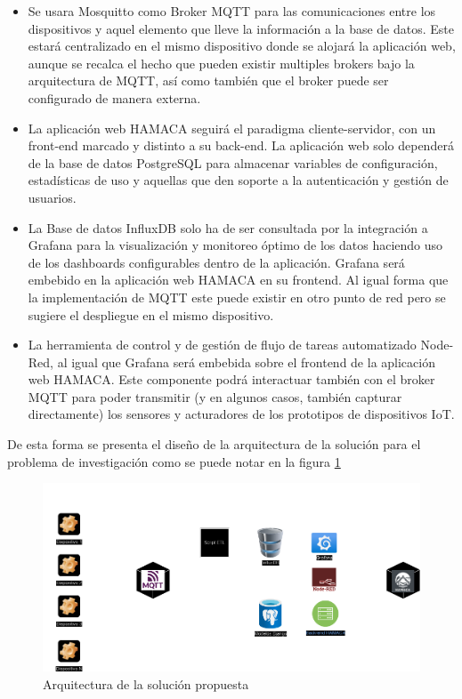 \begin{itemize}

\item Se usara Mosquitto como Broker MQTT para las comunicaciones entre los dispositivos y aquel elemento que lleve la información a la base de datos. Este estará centralizado en el mismo dispositivo donde se alojará la aplicación web, aunque se recalca el hecho que pueden existir multiples brokers bajo la arquitectura de MQTT, así como también que el broker puede ser configurado de manera externa.


\item La aplicación web HAMACA seguirá el paradigma cliente-servidor, con un front-end marcado y distinto a su back-end. La aplicación web solo dependerá de la base de datos PostgreSQL para almacenar variables de configuración, estadísticas de uso y aquellas que den soporte a la autenticación y gestión de usuarios.


\item La Base de datos InfluxDB solo ha de ser consultada por la integración a Grafana para la visualización y monitoreo óptimo de los datos haciendo uso de los dashboards configurables dentro de la aplicación. Grafana será embebido en la aplicación web HAMACA en su frontend. Al igual forma que la implementación de MQTT este puede existir en otro punto de red pero se sugiere el despliegue en el mismo dispositivo. 

\item La herramienta de control y de gestión de flujo de tareas automatizado Node-Red, al igual que Grafana será embebida sobre el frontend de la aplicación web HAMACA. Este componente podrá interactuar también con el broker MQTT para poder transmitir (y en algunos casos, también capturar directamente) los sensores y acturadores de los prototipos de dispositivos IoT.

\end{itemize}
De esta forma se presenta el diseño de la arquitectura de la solución para el problema de investigación como se puede notar en la figura \ref{fig:arquitectura_hamaca}
\begin{figure}[!htb]
\centering
\includegraphics[scale=0.28]{./Figuras/arquitectura_hamaca.png}
\caption{Arquitectura de la solución propuesta}
\label{fig:arquitectura_hamaca}
\vspace*{-10pt}
\end{figure}

